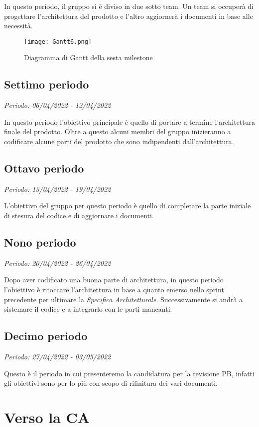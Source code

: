 In questo periodo, il gruppo si è diviso in due sotto team. Un team si occuperà di progettare l'architettura del prodotto e l'altro aggiornerà i documenti in base alle necessità.

\begin{figure}[H]
    \texttt{[image: Gantt6.png]}
    \caption{Diagramma di Gantt della sesta milestone}
\end{figure}

\subsection{Settimo periodo}
\textit{Periodo: 06/04/2022 - 12/04/2022}

In questo periodo l'obiettivo principale è quello di portare a termine l'architettura finale del prodotto. Oltre a questo alcuni membri del gruppo inizieranno a codificare alcune parti del prodotto che sono indipendenti dall'architettura.

\subsection{Ottavo periodo}
\textit{Periodo: 13/04/2022 - 19/04/2022}

L'obiettivo del gruppo per questo periodo è quello di completare la parte iniziale di stesura del codice e di aggiornare i documenti.

\subsection{Nono periodo}
\textit{Periodo: 20/04/2022 - 26/04/2022}

Dopo aver codificato una buona parte di architettura, in questo periodo l'obiettivo è ritoccare l'architettura in base a quanto emerso nello sprint precedente per ultimare la \textit{Specifica Architetturale}. Successivamente si andrà a sistemare il codice e a integrarlo con le parti mancanti.

\subsection{Decimo periodo}
\textit{Periodo: 27/04/2022 - 03/05/2022}

Questo è il periodo in cui presenteremo la candidatura per la revisione PB, infatti gli obiettivi sono per lo più con scopo di rifinitura dei vari documenti.

\section{Verso la CA}

